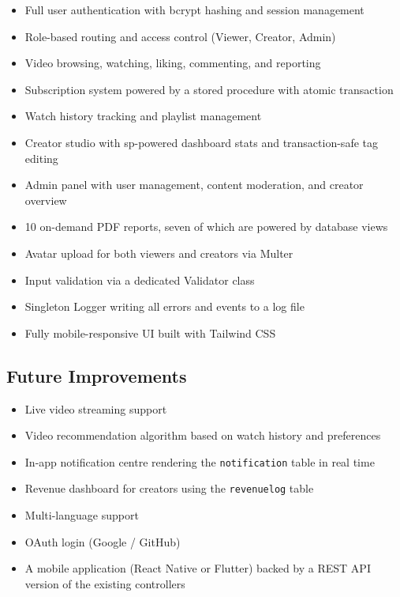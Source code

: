 \documentclass[a4paper, twoside]{article}
\begin{document}
\begin{itemize}
    \item Full user authentication with bcrypt hashing and session management
    \item Role-based routing and access control (Viewer, Creator, Admin)
    \item Video browsing, watching, liking, commenting, and reporting
    \item Subscription system powered by a stored procedure with atomic transaction
    \item Watch history tracking and playlist management
    \item Creator studio with sp-powered dashboard stats and transaction-safe tag editing
    \item Admin panel with user management, content moderation, and creator overview
    \item 10 on-demand PDF reports, seven of which are powered by database views
    \item Avatar upload for both viewers and creators via Multer
    \item Input validation via a dedicated Validator class
    \item Singleton Logger writing all errors and events to a log file
    \item Fully mobile-responsive UI built with Tailwind CSS
\end{itemize}

\subsection{Future Improvements}
\begin{itemize}
    \item Live video streaming support
    \item Video recommendation algorithm based on watch history and preferences
    \item In-app notification centre rendering the \texttt{notification} table in real time
    \item Revenue dashboard for creators using the \texttt{revenuelog} table
    \item Multi-language support
    \item OAuth login (Google / GitHub)
    \item A mobile application (React Native or Flutter) backed by a REST API version of the existing controllers
\end{itemize}
\end{document}
